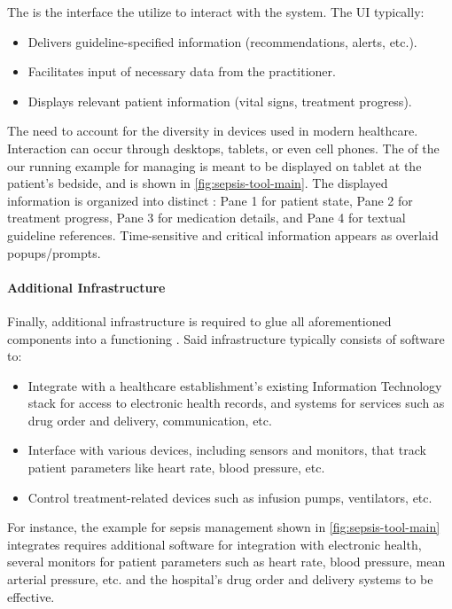 The \UI{} is the interface the \HCPs{} utilize to interact with the system.
The UI typically:
\begin{itemize}
  \item Delivers guideline-specified information (recommendations, alerts, etc.).
  \item Facilitates input of necessary data from the practitioner.
  \item Displays relevant patient information (vital signs, treatment progress).
\end{itemize}

The \UIs{} need to account for the diversity in devices used in modern
healthcare. Interaction can occur through desktops, tablets, or even cell
phones. The \UI{} of the our running example \CDSS{} for managing \CDSS{}
is meant to be displayed on tablet at the patient's bedside, and is shown in
\autoref{fig:sepsis-tool-main}.
The displayed information is organized into distinct :
Pane 1 for patient state, Pane 2 for treatment progress,
Pane 3 for medication details, and Pane 4 for textual guideline references.
Time-sensitive and critical information appears as overlaid popups/prompts.

\paragraph{Additional Infrastructure}

Finally, additional infrastructure is required to glue all aforementioned
components into a functioning \CDSS{}. Said infrastructure typically consists
of software to:
\begin{itemize}
  \item Integrate with a healthcare establishment's existing Information Technology
    stack for access to electronic health records, and systems for services such
    as drug order and delivery, \HCP{} communication, etc.
  \item Interface with various devices, including sensors and monitors,
    that track patient parameters like heart rate, blood pressure, etc.
  \item Control treatment-related devices such as infusion pumps, ventilators, etc.
\end{itemize}
For instance, the example \CDSS{} for sepsis management shown in
\autoref{fig:sepsis-tool-main} integrates requires additional software for integration with
electronic health, several monitors for patient parameters
such as heart rate, blood pressure, mean arterial pressure, etc. and the
hospital's drug order and delivery systems to be effective.

